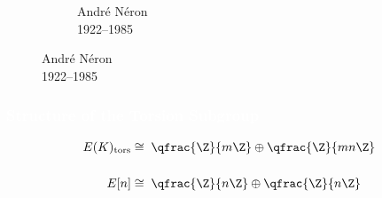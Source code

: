 \begin{frame}[plain]
\begin{figure}[h]
\begin{subfigure}{0.3\textwidth}
	\caption{\hspace{0.6cm}Andr\'e N\'eron \\ \hspace{0.75cm}1922--1985}
	\end{subfigure}
	\end{figure}
\end{frame}


\begin{frame}[plain]
\frametitle{\textcolor{white}{Structure of the Torsion Subgroup}}
	\[
	\begin{split}
	E(K)_{\text{tors}} &\cong\; \qfrac{\Z}{m\Z} \oplus \qfrac{\Z}{mn\Z} \\[0.5cm]
	E[n] &\cong\; \qfrac{\Z}{n\Z} \oplus \qfrac{\Z}{n\Z}
	\end{split}
	\]
\end{frame}


